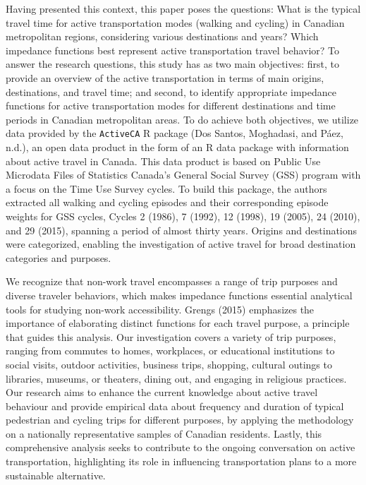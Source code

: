 \documentclass[preprint, 3p,
authoryear]{elsarticle} %
\begin{document}
Having presented this context, this paper poses the questions: What is
the typical travel time for active transportation modes (walking and
cycling) in Canadian metropolitan regions, considering various
destinations and years? Which impedance functions best represent active
transportation travel behavior? To answer the research questions, this
study has as two main objectives: first, to provide an overview of the
active transportation in terms of main origins, destinations, and travel
time; and second, to identify appropriate impedance functions for active
transportation modes for different destinations and time periods in
Canadian metropolitan areas. To do achieve both objectives, we utilize
data provided by the \texttt{ActiveCA} R package (Dos Santos, Moghadasi,
and Páez, n.d.), an open data product in the form of an R data package
with information about active travel in Canada. This data product is
based on Public Use Microdata Files of Statistics Canada's General
Social Survey (GSS) program with a focus on the Time Use Survey cycles.
To build this package, the authors extracted all walking and cycling
episodes and their corresponding episode weights for GSS cycles, Cycles
2 (1986), 7 (1992), 12 (1998), 19 (2005), 24 (2010), and 29 (2015),
spanning a period of almost thirty years. Origins and destinations were
categorized, enabling the investigation of active travel for broad
destination categories and purposes.

We recognize that non-work travel encompasses a range of trip purposes
and diverse traveler behaviors, which makes impedance functions
essential analytical tools for studying non-work accessibility. Grengs
(2015) emphasizes the importance of elaborating distinct functions for
each travel purpose, a principle that guides this analysis. Our
investigation covers a variety of trip purposes, ranging from commutes
to homes, workplaces, or educational institutions to social visits,
outdoor activities, business trips, shopping, cultural outings to
libraries, museums, or theaters, dining out, and engaging in religious
practices. Our research aims to enhance the current knowledge about
active travel behaviour and provide empirical data about frequency and
duration of typical pedestrian and cycling trips for different purposes,
by applying the methodology on a nationally representative samples of
Canadian residents. Lastly, this comprehensive analysis seeks to
contribute to the ongoing conversation on active transportation,
highlighting its role in influencing transportation plans to a more
sustainable alternative.
\end{document}
